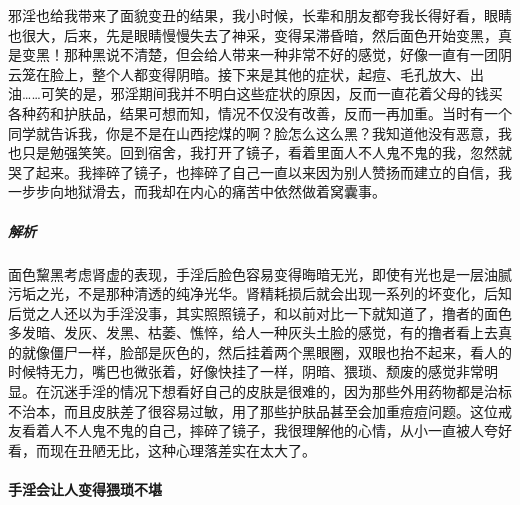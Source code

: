 \begin{case}
    邪淫也给我带来了面貌变丑的结果，我小时候，长辈和朋友都夸我长得好看，眼睛也很大，后来，先是眼睛慢慢失去了神采，变得呆滞昏暗，然后面色开始变黑，真是变黑！那种黑说不清楚，但会给人带来一种非常不好的感觉，好像一直有一团阴云笼在脸上，整个人都变得阴暗。接下来是其他的症状，起痘、毛孔放大、出油……可笑的是，邪淫期间我并不明白这些症状的原因，反而一直花着父母的钱买各种药和护肤品，结果可想而知，情况不仅没有改善，反而一再加重。当时有一个同学就告诉我，你是不是在山西挖煤的啊？脸怎么这么黑？我知道他没有恶意，我也只是勉强笑笑。回到宿舍，我打开了镜子，看着里面人不人鬼不鬼的我，忽然就哭了起来。我摔碎了镜子，也摔碎了自己一直以来因为别人赞扬而建立的自信，我一步步向地狱滑去，而我却在内心的痛苦中依然做着窝囊事。
    \subparagraph{解析} 面色黧黑考虑肾虚的表现，手淫后脸色容易变得晦暗无光，即使有光也是一层油腻污垢之光，不是那种清透的纯净光华。肾精耗损后就会出现一系列的坏变化，后知后觉之人还以为手淫没事，其实照照镜子，和以前对比一下就知道了，撸者的面色多发暗、发灰、发黑、枯萎、憔悴，给人一种灰头土脸的感觉，有的撸者看上去真的就像僵尸一样，脸部是灰色的，然后挂着两个黑眼圈，双眼也抬不起来，看人的时候特无力，嘴巴也微张着，好像快挂了一样，阴暗、猥琐、颓废的感觉非常明显。在沉迷手淫的情况下想看好自己的皮肤是很难的，因为那些外用药物都是治标不治本，而且皮肤差了很容易过敏，用了那些护肤品甚至会加重痘痘问题。这位戒友看着人不人鬼不鬼的自己，摔碎了镜子，我很理解他的心情，从小一直被人夸好看，而现在丑陋无比，这种心理落差实在太大了。
\end{case}

\paragraph{手淫会让人变得猥琐不堪}

